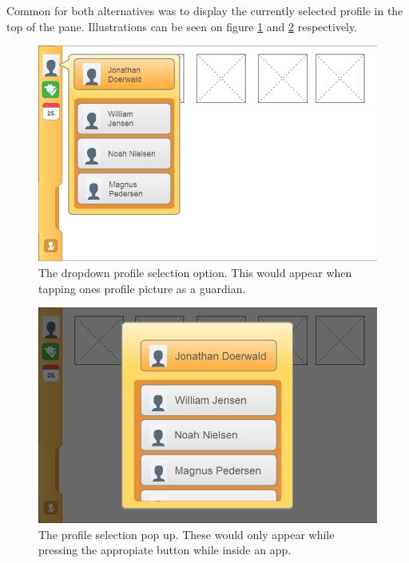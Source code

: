Common for both alternatives was to display the currently selected profile in the top of the pane.
Illustrations can be seen on figure \ref{fig:profileselectionlauncherdropdown} and \ref{fig:profileselectionapppopup} respectively.

\begin{figure}[p]
    \includegraphics[width=\textwidth]{figures/sprint2/profileselectionhomescreen-dropdown}
    \caption{The dropdown profile selection option. This would appear when tapping ones profile picture as a guardian.}
    \label{fig:profileselectionlauncherdropdown}
\end{figure}

\begin{figure}[p]
    \includegraphics[width=\textwidth]{figures/sprint2/profileselection-dialog-finish}
    \caption{The profile selection pop up. These would only appear while pressing the appropiate button while inside an app.}
    \label{fig:profileselectionapppopup}
\end{figure}

